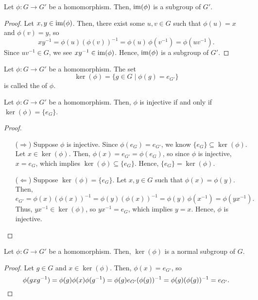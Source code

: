 \begin{prop}\label{prop:image_subgroup}
Let $ \phi:G\to G' $ be a homomorphism. Then, $ \operatorname{im}(\phi) $ is a subgroup of $ G' $.
\end{prop}
\begin{proof}
Let $ x,y\in\operatorname{im}(\phi) $. Then, there exist some $ u,v\in G $ such that $ \phi(u)=x $ and $ \phi(v)=y $, so
\begin{equation*}
    xy^{-1}=\phi(u)(\phi(v))^{-1}=\phi(u)\,\phi(v^{-1})=\phi(uv^{-1}).
\end{equation*}
Since $ uv^{-1}\in G $, we see $ xy^{-1}\in\operatorname{im}(\phi) $. Hence, $ \operatorname{im}(\phi) $ is a subgroup of $ G' $.
\end{proof}

\begin{defn}
Let $ \phi:G\to G' $ be a homomorphism. The set
\begin{equation*}
    \ker(\phi)=\{g\in G\mid\phi(g)=e_{G'}\}
\end{equation*}
is called the  of $ \phi $.
\end{defn}

\begin{thm}\label{thm:monomorphism}
Let $ \phi:G\to G' $ be a homomorphism. Then, $ \phi $ is injective if and only if $ \ker(\phi)=\{e_G\} $.
\end{thm}
\begin{proof}~
\begin{enumerate}
    \item[($ \Rightarrow $)] Suppose $ \phi $ is injective. Since $ \phi(e_G)=e_{G'} $, we know $ \{e_G\}\subseteq\ker(\phi) $. Let $ x\in\ker(\phi) $. Then, $ \phi(x)=e_{G'}=\phi(e_G) $, so since $ \phi $ is injective, $ x=e_G $, which implies $ \ker(\phi)\subseteq\{e_G\} $. Hence, $ \{e_G\}=\ker(\phi) $.

    \item[($ \Leftarrow $)] Suppose $ \ker(\phi)=\{e_G\} $. Let $ x,y\in G $ such that $ \phi(x)=\phi(y) $. Then,
    \begin{equation*}
        e_{G'}=\phi(x)(\phi(x))^{-1}=\phi(y)(\phi(x))^{-1}=\phi(y)\,\phi(x^{-1})=\phi(yx^{-1}).
    \end{equation*}
    Thus, $ yx^{-1}\in\ker(\phi) $, so $ yx^{-1}=e_G $, which implies $ y=x $. Hence, $ \phi $ is injective.\qedhere
\end{enumerate}
\end{proof}

\begin{thm}\label{thm:ker_normal_subgroup}
Let $ \phi:G\to G' $ be a homomorphism. Then, $ \ker(\phi) $ is a normal subgroup of $ G $.
\end{thm}
\begin{proof}
Let $ g\in G $ and $ x\in\ker(\phi) $. Then, $ \phi(x)=e_{G'} $, so
\begin{equation*}
    \phi(gxg^{-1})=\phi(g)\phi(x)\phi(g^{-1})=\phi(g)e_{G'}(\phi(g))^{-1}=\phi(g)(\phi(g))^{-1}=e_{G'}.\qedhere
\end{equation*}
\end{proof}

